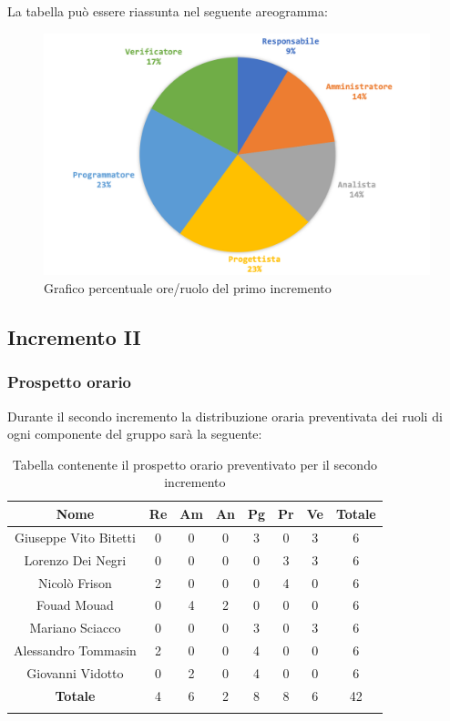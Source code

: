 		La tabella può essere riassunta nel seguente areogramma:
		\begin{figure}[H]
			\centering
			\includegraphics[width=0.8\linewidth]{./images/preventivo/incremento1-2.png}
			\caption{Grafico percentuale ore/ruolo del primo incremento}
			\label{fig:grafico costi ruolo incremento I}
		\end{figure}
	
	
	
	\subsection{Incremento II}
		\subsubsection{Prospetto orario}
		Durante il secondo incremento la distribuzione oraria preventivata dei ruoli di ogni componente del gruppo sarà la seguente:
		
		\begin{longtable}{|c|c|c|c|c|c|c|c|}
			\hline
			\rowcolor{lighter-grayer}
			\textbf{Nome} & \textbf{Re} & \textbf{Am} & \textbf{An} & \textbf{Pg}  & \textbf{Pr}   & \textbf{Ve} & \textbf{Totale} \\
			\hline
			\endfirsthead
			
			\hline
			Giuseppe Vito Bitetti 		 & 0 & 0 & 0 & 3 & 0 & 3 & 6\\
			\hline
			\hline
			Lorenzo Dei Negri			 & 0 & 0 & 0 & 0 & 3 & 3 & 6\\
			\hline
			\hline
			Nicolò Frison				    & 2 & 0 & 0 & 0 & 4 & 0 & 6\\
			\hline
			\hline
			Fouad Mouad 				 & 0 & 4 & 2 & 0 & 0 & 0 & 6\\
			\hline
			\hline
			Mariano Sciacco 			 & 0 & 0 & 0 & 3 & 0 & 3 & 6\\
			\hline
			\hline
			Alessandro Tommasin     & 2 & 0 & 0 & 4 & 0 & 0 & 6\\
			\hline
			\hline
			Giovanni Vidotto 			 & 0 & 2 & 0 & 4 & 0 & 0 & 6\\
			\hline 
			\textbf{Totale}			 		& 4 & 6 & 2 & 8 & 8 & 6 & 42\\
			\hline
			\caption{Tabella contenente il prospetto orario preventivato per il secondo incremento}
		\end{longtable}
		\pagebreak
		
